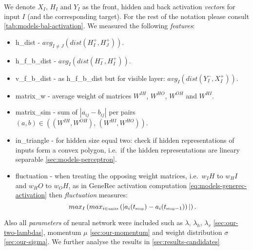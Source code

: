 We denote $X_I$, $H_I$ and $Y_I$ as the front, hidden and back activation \emph{vector}s for input $I$ (and the corresponding target). For the rest of the notation please consult \ref{tab:models-bal-activation}. We measured the following \emph{features}: 
\begin{itemize} 
\item h\_dist - $avg_{I \neq J}\left(dist(H_I^{+},H_J^{+})\right)$.
\item h\_f\_b\_dist - $avg_{I}\left(dist(H_I^{-},H_I^{+})\right)$.
\item	v\_f\_b\_dist - as h\_f\_b\_dist but for visible layer: $avg_{I}\left(dist(Y_I^{-},X_I^{+})\right)$. 
\item matrix\_w - average weight of matrices $W^{IH}$, $W^{HO}$, $W^{OH}$ and $W^{HI}$. 
\item matrix\_sim - sum of $|a_{ij} - b_{ij}|$ per pairs $(a,b) \in ((W^{IH}, W^{OH}),\, (W^{HI}, W^{HO}))$. 
\item \label{sec:our-in-triangle} in\_triangle - for hidden size equal two: check if hidden representations of inputs form a convex polygon, i.e.~if the hidden representations are lineary separable \ref{sec:models-perceptron}. 
\item fluctuation - when treating the opposing weight matrices, i.e.~$w_IH$ to $w_HI$ and $w_HO$ to $w_OH$, as in GeneRec activation computation \ref{eq:models-generec-activation} then \emph{fluctuation} measures:
\begin{equation}
  \label{eq:our-fluctuation}
  max_{I}\left(
    max_{i \in \mbox{\tiny units}}\left(
      |a_i(t_{\mbox{\tiny stop}}) - a_i(t_{\mbox{\tiny stop}-1})
    \right)|
  \right). 
\end{equation}



\end{itemize} 

Also all \emph{parameters} of neural network were included such as $\lambda$, $\lambda_h$, $\lambda_v$ \ref{sec:our-two-lambdas}, momentum $\mu$ \ref{sec:our-momentum} and weight distribution $\sigma$ \ref{sec:our-sigma}. We further analyse the results in \ref{sec:results-candidates} 
